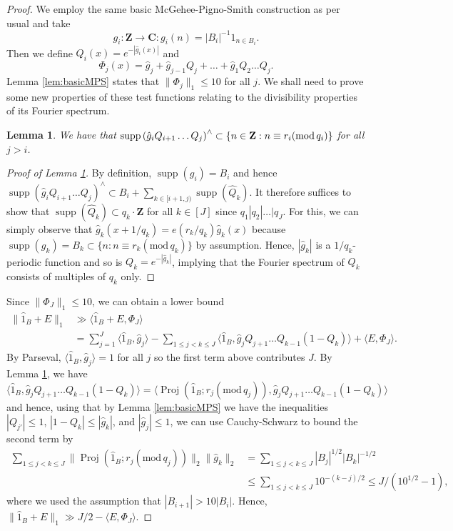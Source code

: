 \documentclass[11pt, reqno]{amsart}
\newtheorem{lemma}[theorem]{Lemma}
\newcommand{\md}[1]{\ensuremath{(\mbox{mod}\, #1)}}
\newcommand{\mdlem}[1]{\ensuremath{(\mbox{\textup{mod}}\, #1)}}
\DeclareMathOperator\supp{supp}
\DeclareMathOperator{\Proj}{Proj}
\begin{document}
\begin{proof}
    We employ the same basic McGehee-Pigno-Smith construction as per usual and take $$g_i:\mathbf{Z}\to\mathbf{C}:g_i(n)=|B_i|^{-1}1_{n\in B_i}.$$
    Then we define $Q_i(x)=e^{-|\hat{g}_i(x)|}$ and $$\Phi_j(x)=\hat{g}_j+\hat{g}_{j-1}Q_j+\dots+\hat{g}_1Q_2\dots Q_j.$$ Lemma \ref{lem:basicMPS} states that $\lVert \Phi_j\rVert_1\leqslant 10$ for all $j$. We shall need to prove some new properties of these test functions relating to the divisibility properties of its Fourier spectrum.
    \begin{lemma}\label{lem:modularMPS}
We have that $\supp\left(\hat{g}_iQ_{i+1}\dots Q_j\right)^\wedge \subset \{n\in \mathbf{Z}: n\equiv r_i\mdlem{q_i}\}$ for all $j>i$.
\end{lemma}
\begin{proof}[Proof of Lemma \ref{lem:modularMPS}]
By definition, $\supp(g_i)=B_i$ and hence $\supp(\hat{g}_iQ_{i+1}\dots Q_j)^\wedge\subset B_i+\sum_{k\in[i+1,j)}\supp(\hat{Q}_k)$. It therefore suffices to show that $\supp(\hat{Q}_k)\subset q_k\cdot\mathbf{Z}$ for all $k\in [J]$ since $q_1|q_2|\dots|q_J$. For this, we can simply observe that $\hat{g}_k(x+1/q_k)=e(r_k/q_k)\hat{g}_k(x)$ because $\supp(g_k)=B_k\subset\{n:n\equiv r_k\md{q_k}\}$ by assumption. Hence, $|\hat{g}_k|$ is a $1/q_k$-periodic function and so is $Q_k=e^{-|\hat{g}_k|}$, implying that the Fourier spectrum of $Q_k$ consists of multiples of $q_k$ only.
\end{proof}
Since $\lVert \Phi_J\rVert_1\leqslant 10$, we can obtain a lower bound
\begin{align*}
\lVert \hat{1}_B+E\rVert_1&\gg \langle \hat{1}_B+E,\Phi_J\rangle\\
&=\sum_{j=1}^J\langle \hat{1}_B, \hat{g}_j\rangle - \sum_{1\leqslant j<k\leqslant J}\langle \hat{1}_B,\hat{g}_jQ_{j+1}\dots Q_{k-1}(1-Q_k)\rangle + \langle E,\Phi_J\rangle.
\end{align*}
By Parseval, $\langle \hat{1}_B, \hat{g}_j\rangle = 1$ for all $j$ so the first term above contributes $J$. By Lemma \ref{lem:modularMPS}, we have $$\langle \hat{1}_B,\hat{g}_jQ_{j+1}\dots Q_{k-1}(1-Q_k)\rangle =\langle \Proj(\hat{1}_B; r_j\md{q_j}),\hat{g}_jQ_{j+1}\dots Q_{k-1}(1-Q_k)\rangle$$ and hence, using that by Lemma \ref{lem:basicMPS} we have the inequalities $|Q_{j'}|\leqslant 1$, $|1-Q_k|\leqslant |\hat{g}_k|$, and $|\hat{g}_j|\leqslant 1$, we can use Cauchy-Schwarz to bound the second term by
\begin{align*}
    \sum_{1\leqslant j<k\leqslant J} \lVert \Proj(\hat{1}_B;r_j\md{q_j})\rVert_2\lVert \hat{g}_k\rVert_2 &= \sum_{1\leqslant j<k\leqslant J} |B_j|^{1/2}|B_k|^{-1/2}\\
    &\leqslant \sum_{1\leqslant j<k\leqslant J} 10^{-(k-j)/2}\leqslant J/(10^{1/2}-1),
\end{align*}
where we used the assumption that $|B_{i+1}|>10|B_i|$. Hence, $\lVert \hat{1}_B+E\rVert_1\gg J/2-\langle E,\Phi_J\rangle$.


\end{proof}
\end{document}
